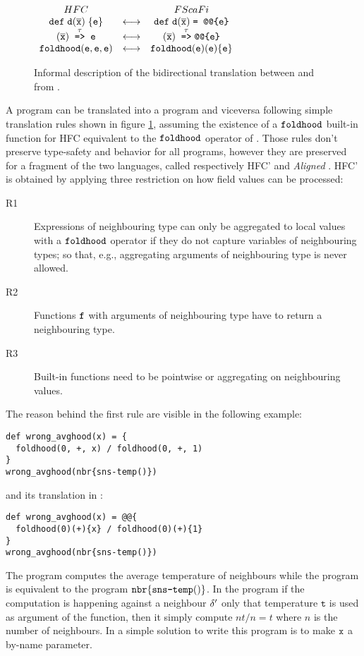 \begin{figure}[!t]
\centering
\centerline{$
\begin{array}{ccc}
HFC{} && {\sc{}FScaFi}{} \\
\mathtt{def} \; \mathtt{d} (\overline{\mathtt{x}}) \; \{\mathtt{e}\} &\longleftrightarrow& \mathtt{def} \; \mathtt{d} (\overline{\mathtt{x}}) \; \mathrm{ \texttt{= @@\{} \mathtt{e} \texttt{\}} } \\
(\overline{\mathtt{x}}) \; \stackrel{\tau}{\mathrm{\texttt{=>}}} \; \mathtt{e} &\longleftrightarrow& (\overline{\mathtt{x}}) \; \stackrel{\tau}{\mathrm{\texttt{=>}}}\mathrm{ \texttt{@@\{} \mathtt{e} \texttt{\}}} \\
\mathtt{foldhood}(\mathtt{e}, \mathtt{e}, \mathtt{e}) &\longleftrightarrow& \mathtt{foldhood}(\mathtt{e})(\mathtt{e})\{\mathtt{e}\}
\end{array}
$
}
\caption{Informal description of the bidirectional translation between \HFC{} and \FSCAFI{} from \cite{Scafi}.} \label{fig:fscafitranslation}
\end{figure}

A \FSCAFI program can be translated into a \HFC{} program and viceversa following simple translation rules shown in figure \ref{fig:fscafitranslation}, assuming the existence of a $\mathtt{foldhood}$ built-in function for HFC equivalent to the $\mathtt{foldhood}$ operator of \FSCAFI. Those rules don't preserve type-safety and behavior for all programs, however they are preserved for a fragment of the two languages, called respectively HFC' and \textit{Aligned} \FSCAFI. HFC' is obtained by applying three restriction on how field values can be processed:
\begin{description}
	\item[R1]
	Expressions of neighbouring type can only be aggregated to local values with a $\mathtt{foldhood}$ operator if they do not capture variables of neighbouring types; so that, e.g., aggregating arguments of neighbouring type is never allowed.
	\item[R2]
	Functions $\mathtt{f}$ with arguments of neighbouring type have to return a neighbouring type.
	\item[R3]
	Built-in functions need to be pointwise or aggregating on neighbouring values.
\end{description}
The reason behind the first rule are visible in the following example:
\begin{lstlisting}[]
def wrong_avghood(x) = {
  foldhood(0, +, x) / foldhood(0, +, 1)
}
wrong_avghood(nbr{sns-temp()})
\end{lstlisting}
and its translation in  \FSCAFI:
\begin{lstlisting}[]
def wrong_avghood(x) = @@{
  foldhood(0)(+){x} / foldhood(0)(+){1}
}
wrong_avghood(nbr{sns-temp()})
\end{lstlisting}
The \HFC{} program computes the average temperature of neighbours while the \FSCAFI{} program is equivalent to the program $\mathtt{nbr}\{\texttt{sns-temp}()\}$. In the \FSCAFI program if the computation is happening against a neighbour $\delta'$ only that temperature $\mathtt{t}$ is used as argument of the function, then it simply compute $nt/n = t$ where $n$ is the number of neighbours. In \Scafi{} a simple solution to write this program is to make $\mathtt{x}$ a by-name parameter.

